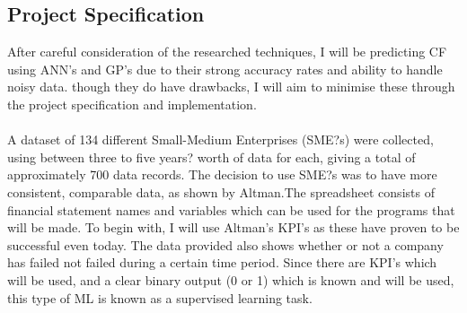 \documentclass[11pt]{article}
\begin{document}
\subsection{Project Specification}
After careful consideration of the researched techniques, I will be predicting CF using ANN's and GP's due to their strong accuracy rates and ability to handle noisy data. though they do have drawbacks, I will aim to minimise these through the project specification and implementation.\\
\\
A dataset of 134 different Small-Medium Enterprises (SME?s) were collected, using between three to five years? worth of data for each, giving a total of approximately 700 data records. The decision to use SME?s was to have more consistent, comparable data, as shown by Altman.The spreadsheet consists of financial statement names and variables which can be used for the programs that will be made. To begin with, I will use Altman's KPI's as these have proven to be successful even today. 
The data provided also shows whether or not a company has failed not failed during a certain time period. Since there are KPI's which will be used, and a clear binary output (0 or 1) which is known and will be used, this type of ML is known as a supervised learning task. \\
\end{document}
